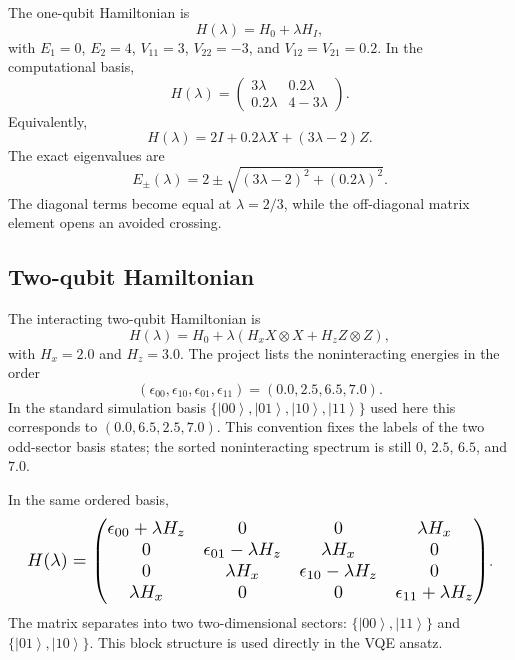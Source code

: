 \documentclass[10pt,a4paper]{article}
\newcommand{\ket}[1]{\left|#1\right\rangle}
\begin{document}
The one-qubit Hamiltonian is
\begin{equation}
H(\lambda)=H_0+\lambda H_I,
\end{equation}
with $E_1=0$, $E_2=4$, $V_{11}=3$, $V_{22}=-3$, and $V_{12}=V_{21}=0.2$. In the computational basis,
\begin{equation}
H(\lambda)=\begin{pmatrix} 3\lambda & 0.2\lambda\\ 0.2\lambda & 4-3\lambda \end{pmatrix}.
\label{eq:onequbit_hamiltonian}
\end{equation}
Equivalently,
\begin{equation}
H(\lambda)=2I+0.2\lambda X+(3\lambda-2)Z.
\end{equation}
The exact eigenvalues are
\begin{equation}
E_\pm(\lambda)=2\pm\sqrt{(3\lambda-2)^2+(0.2\lambda)^2}.
\label{eq:onequbit_exact}
\end{equation}
The diagonal terms become equal at $\lambda=2/3$, while the off-diagonal matrix element opens an avoided crossing.

\subsection{Two-qubit Hamiltonian}

The interacting two-qubit Hamiltonian is
\begin{equation}
H(\lambda)=H_0+\lambda\left(H_x X\otimes X+H_z Z\otimes Z\right),
\end{equation}
with $H_x=2.0$ and $H_z=3.0$. The project lists the noninteracting energies in the order
\begin{equation}
(\epsilon_{00},\epsilon_{10},\epsilon_{01},\epsilon_{11})=(0.0,2.5,6.5,7.0).
\end{equation}
In the standard simulation basis $\{\ket{00},\ket{01},\ket{10},\ket{11}\}$ used here this corresponds to $(0.0,6.5,2.5,7.0)$. This convention fixes the labels of the two odd-sector basis states; the sorted noninteracting spectrum is still $0$, $2.5$, $6.5$, and $7.0$.

In the same ordered basis,
\begin{equation}
\resizebox{0.96\columnwidth}{!}{$\displaystyle
H(\lambda)=\begin{pmatrix}
\epsilon_{00}+\lambda H_z & 0 & 0 & \lambda H_x\\
0 & \epsilon_{01}-\lambda H_z & \lambda H_x & 0\\
0 & \lambda H_x & \epsilon_{10}-\lambda H_z & 0\\
\lambda H_x & 0 & 0 & \epsilon_{11}+\lambda H_z
\end{pmatrix}$}.
\label{eq:twoqubit_hamiltonian}
\end{equation}
The matrix separates into two two-dimensional sectors: $\{\ket{00},\ket{11}\}$ and $\{\ket{01},\ket{10}\}$. This block structure is used directly in the VQE ansatz.
\end{document}
